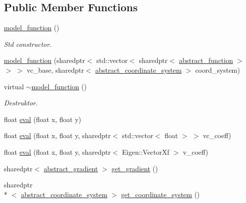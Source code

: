 \subsection*{Public Member Functions}
\begin{DoxyCompactItemize}
\item 
\hypertarget{classmodel__function_a1a982c2cec5a63de6c1480e0b1c946eb}{\hyperlink{classmodel__function_a1a982c2cec5a63de6c1480e0b1c946eb}{model\-\_\-function} ()}\label{classmodel__function_a1a982c2cec5a63de6c1480e0b1c946eb}

\begin{DoxyCompactList}\small\item\em Std constructor. \end{DoxyCompactList}\item 
\hyperlink{classmodel__function_a2e9d9ebb47826758798b094079f1abcc}{model\-\_\-function} (sharedptr$<$ std\-::vector$<$ sharedptr$<$ \hyperlink{classabstract__function}{abstract\-\_\-function} $>$ $>$ $>$ vc\-\_\-base, sharedptr$<$ \hyperlink{classabstract__coordinate__system}{abstract\-\_\-coordinate\-\_\-system} $>$ coord\-\_\-system)
\item 
\hypertarget{classmodel__function_a9f51895f06daf4d454b16eccf44dc57c}{virtual \hyperlink{classmodel__function_a9f51895f06daf4d454b16eccf44dc57c}{$\sim$model\-\_\-function} ()}\label{classmodel__function_a9f51895f06daf4d454b16eccf44dc57c}

\begin{DoxyCompactList}\small\item\em Destruktor. \end{DoxyCompactList}\item 
float \hyperlink{classmodel__function_a5ca38b00e9064eb46b697dab3b3e848f}{eval} (float x, float y)
\item 
float \hyperlink{classmodel__function_add97095253744605c1da638d2dc6c3b0}{eval} (float x, float y, sharedptr$<$ std\-::vector$<$ float $>$ $>$ vc\-\_\-coeff)
\item 
float \hyperlink{classmodel__function_a2f5c7afd1f910bef7f545c0384a23c1e}{eval} (float x, float y, sharedptr$<$ Eigen\-::\-Vector\-Xf $>$ v\-\_\-coeff)
\item 
sharedptr$<$ \hyperlink{classabstract__gradient}{abstract\-\_\-gradient} $>$ \hyperlink{classmodel__function_adf3a7a6ff204c7e993f63f61cd2cfcf1}{get\-\_\-gradient} ()
\item 
\hypertarget{classmodel__function_a0e4bcd2cf988b0e9f06d25f9ef552d71}{sharedptr\\*
$<$ \hyperlink{classabstract__coordinate__system}{abstract\-\_\-coordinate\-\_\-system} $>$ \hyperlink{classmodel__function_a0e4bcd2cf988b0e9f06d25f9ef552d71}{get\-\_\-coordinate\-\_\-system} ()}\label{classmodel__function_a0e4bcd2cf988b0e9f06d25f9ef552d71}


\end{DoxyCompactItemize}
